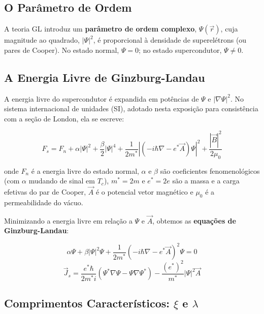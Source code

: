 \documentclass[12pt, a4paper, oneside]{report}
\begin{document}
\subsection{O Parâmetro de Ordem}

A teoria GL introduz um \textbf{parâmetro de ordem complexo}, $\Psi(\vec{r})$, cuja magnitude ao quadrado, $|\Psi|^2$, é proporcional à densidade de superelétrons (ou pares de Cooper). No estado normal, $\Psi = 0$; no estado supercondutor, $\Psi \neq 0$.

\subsection{A Energia Livre de Ginzburg-Landau}

A energia livre do supercondutor é expandida em potências de $\Psi$ e $|\nabla \Psi|^2$. No sistema internacional de unidades (SI), adotado nesta exposição para consistência com a seção de London, ela se escreve:

\begin{equation}
    F_s = F_n + \alpha |\Psi|^2 + \frac{\beta}{2} |\Psi|^4 + \frac{1}{2m^*} \left| \left( -i\hbar \nabla - e^* \vec{A} \right) \Psi \right|^2 + \frac{|\vec{B}|^2}{2\mu_0}
\end{equation}

onde $F_n$ é a energia livre do estado normal, $\alpha$ e $\beta$ são coeficientes fenomenológicos (com $\alpha$ mudando de sinal em $T_c$), $m^* = 2m$ e $e^* = 2e$ são a massa e a carga efetivas do par de Cooper, $\vec{A}$ é o potencial vetor magnético e $\mu_0$ é a permeabilidade do vácuo.

Minimizando a energia livre em relação a $\Psi$ e $\vec{A}$, obtemos as \textbf{equações de Ginzburg-Landau}:

\begin{equation}
    \alpha \Psi + \beta |\Psi|^2 \Psi + \frac{1}{2m^*} \left( -i\hbar \nabla - e^* \vec{A} \right)^2 \Psi = 0
\end{equation}
\begin{equation}
    \vec{J}_s = \frac{e^* \hbar}{2m^* i} (\Psi^* \nabla \Psi - \Psi \nabla \Psi^*) - \frac{(e^*)^2}{m^*} |\Psi|^2 \vec{A}
\end{equation}

\subsection{Comprimentos Característicos: $\xi$ e $\lambda$}
\end{document}
